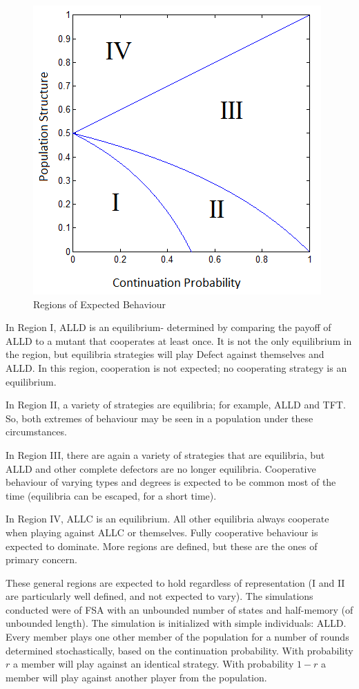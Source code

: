 \documentclass[a4paper,11pt,bcshonoursthesis,singlespace,oneside,thesisdraft,pdflatex]{cssethesis}
\begin{document}
\begin{figure}[h]
\center
\includegraphics{regions}
\caption{Regions of Expected Behaviour}
\label{fig:regions}
\end{figure}

In Region I, ALLD is an equilibrium- determined by comparing the payoff of ALLD to a mutant that cooperates at least once. It is not the only equilibrium in the region, but equilibria strategies will play Defect against themselves and ALLD. In this region, cooperation is not expected; no cooperating strategy is an equilibrium.

In Region II, a variety of strategies are equilibria; for example, ALLD and TFT. So, both extremes of behaviour may be seen in a population under these circumstances. 

In Region III, there are again a variety of strategies that are equilibria, but ALLD and other complete defectors are no longer equilibria. Cooperative behaviour of varying types and degrees is expected to be common most of the time (equilibria can be escaped, for a short time).

In Region IV, ALLC is an equilibrium. All other equilibria always cooperate when playing against ALLC or themselves. Fully cooperative behaviour is expected to dominate. More regions are defined, but these are the ones of primary concern.

These general regions are expected to hold regardless of representation (I and II are particularly well defined, and not expected to vary).
The simulations \citet{van-veelen:PNAS:2012} conducted were of FSA with an unbounded number of states and half-memory (of unbounded length). The simulation is initialized with simple individuals: ALLD. Every member plays one other member of the population for a number of rounds determined stochastically, based on the continuation probability. With probability $r$ a member will play against an identical strategy. With probability $1-r$ a member will play against another player from the population. 
\end{document}
